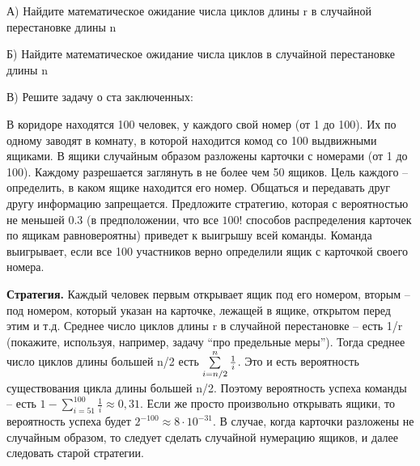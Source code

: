 \begin{problem}

А) Найдите математическое ожидание числа циклов длины r в 
случайной перестановке длины n

Б) Найдите математическое ожидание числа циклов в 
случайной перестановке длины n 

В) Решите задачу о ста заключенных:

В коридоре находятся 100 человек, у каждого свой номер (от 1 до 100). Их по одному заводят в комнату, в которой 
находится комод со 100 выдвижными ящиками. В ящики случайным образом 
разложены карточки с номерами (от 1 до 100). Каждому разрешается заглянуть в 
не более чем 50 ящиков. Цель каждого -- определить, в каком ящике находится 
его номер. Общаться и передавать друг другу информацию запрещается. 
Предложите стратегию, которая с вероятностью не меньшей $0.3$ (в 
предположении, что все $100!$ способов распределения карточек по ящикам 
равновероятны) приведет к выигрышу всей команды. Команда выигрывает, если 
все 100 участников верно определили ящик с карточкой своего номера.

\textbf{Стратегия. }Каждый человек первым открывает ящик под его номером, 
вторым -- под номером, который указан на карточке, лежащей в ящике, открытом 
перед этим и т.д. Среднее число циклов длины r в случайной 
перестановке -- есть 1/r (покажите, используя, например, задачу ``про 
предельные меры''). Тогда среднее число циклов длины большей n/2 
есть $\sum\limits_{i=n \mathord{\left/ {\vphantom {n 2}} \right. 
\kern-\nulldelimiterspace} 2}^n {\frac{1}{i}} $. Это и есть вероятность 
существования цикла длины большей n/2. Поэтому вероятность успеха команды -- 
есть $1-\sum\limits_{i=51}^{100} {\frac{1}{i}} \approx 0,31$. Если 
же просто произвольно открывать ящики, то вероятность успеха будет 
$2^{-100}\approx 8\cdot 10^{-31}$. В случае, когда карточки 
разложены не случайным образом, то следует сделать случайной нумерацию 
ящиков, и далее следовать старой стратегии.

\end{problem}

